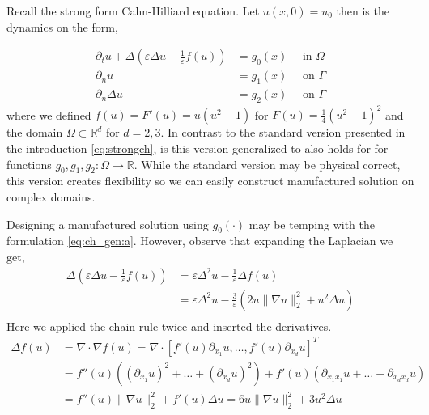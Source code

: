 Recall the strong form Cahn-Hilliard equation. Let $ u( x,0) =  u_{0}$ then is the dynamics on the form,


\begin{subequations}
    \label{eq:ch_gen}
    \begin{align}
    \label{eq:ch_gen:a}
        \partial _{t} u + \Delta  \left(  \varepsilon  \Delta u - \frac{1}{\varepsilon }f( u) \right)   &= g_{0}( x)   \quad \text{ in } \Omega  \\
        \partial _{n} u &= g_{1}( x)  \quad \text{ on } \Gamma  \\
        \partial _{n}    \Delta u   &= g_{2}(x)  \quad \text{ on } \Gamma
    \end{align}
\end{subequations}
where we defined $f( u) = F'( u) =u( u^2 -1)  $ for $F( u) = \frac{1}{4}( u^{2} - 1)^{2} $ and the domain $\Omega \subset \mathbb{R} ^{d} $  for $d = 2,3$. In contrast to the standard version presented in the introduction \eqref{eq:strongch}, is this version
generalized to also holds for for functions $g_{0},g_{1},g_{2}: \Omega \to\mathbb{R}   $. While the standard version may be physical correct, this version creates flexibility so we can easily construct manufactured solution on complex domains.

    Designing a manufactured solution using $g_{0}( \cdot ) $ may be temping with the formulation \eqref{eq:ch_gen:a}. However, observe that expanding the Laplacian we get,
    \begin{equation}
    \begin{split}
        \Delta  \left(  \varepsilon  \Delta u - \frac{1}{\varepsilon }f( u) \right) & = \varepsilon \Delta^2 u - \frac{1}{\varepsilon } \Delta f( u) \\
                                                                                    &= \varepsilon \Delta ^2 u  - \frac{3}{\varepsilon }( 2u \| \nabla u \|_{ 2 }^{ 2 } + u^{2}  \Delta u )   \\
    \end{split}
    \end{equation}
Here we applied the chain rule twice and inserted the derivatives.
\begin{equation}
    \label{eq:nonlinear_laplace}
    \begin{split}
\Delta f( u)  &= \nabla \cdot \nabla f( u)  = \nabla \cdot  \left[ f' ( u) \partial _{x_{1}}u, \ldots, f' ( u) \partial _{x_{d}}u \right] ^{T} \\
& =  f'' ( u)( ( \partial _{x_{1}}u )^{2} + \ldots +( \partial _{x_{d}}u )^{2} ) +  f' ( u)( \partial _{x_{1} x_{1}}u + \ldots +   \partial _{x_{d} x_{d}}u ) \\
&=  f'' ( u) \| \nabla u \|_{ 2 }^{ 2 } + f' ( u)  \Delta u  = 6u \| \nabla u \|_{ 2 }^{ 2 } + 3u^{2}  \Delta u
    \end{split}
\end{equation}


